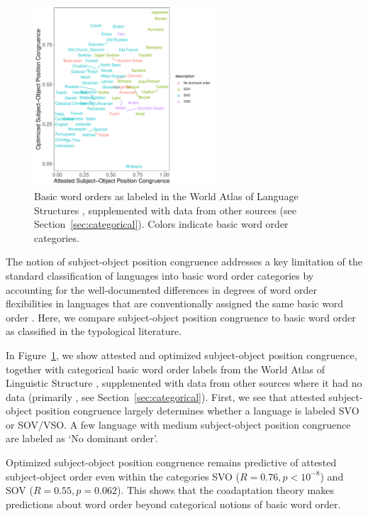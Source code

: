 \documentclass[11pt,a4paper]{article}
\begin{document}
\begin{figure}
    \centering
    \includegraphics[width=0.6\textwidth]{../analysis/categorical_order/figures/by_categorical_order.pdf}
	\caption{Basic word orders as labeled in the World Atlas of Language Structures \citep{wals-81}, supplemented with data from other sources (see Section~\ref{sec:categorical}). Colors indicate basic word order categories.}
    \label{fig:categorical-basic-order}
\end{figure}



The notion of subject-object position congruence addresses a key limitation of the standard classification of languages into basic word order categories by accounting for the well-documented differences in degrees of word order flexibilities in languages that are conventionally assigned the same basic word order \citep{steele1978word}.
Here, we compare subject-object position congruence to basic word order as classified in the typological literature.


In Figure~\ref{fig:categorical-basic-order}, we show attested and optimized subject-object position congruence, together with categorical basic word order labels from the World Atlas of Linguistic Structure \citep{wals-81}, supplemented with data from other sources where it had no data (primarily \citep{gell-mann-origin-2011}, see Section~\ref{sec:categorical}).
First, we see that attested subject-object position congruence largely determines whether a language is labeled SVO or SOV/VSO.
A few language with medium subject-object position congruence are labeled as `No dominant order'.

Optimized subject-object position congruence remains predictive of attested subject-object order even within the categories SVO ($R = 0.76, p < 10^{-8}$) and SOV ($R=0.55, p = 0.062$).
This shows that the coadaptation theory makes predictions about word order beyond categorical notions of basic word order.
\end{document}

